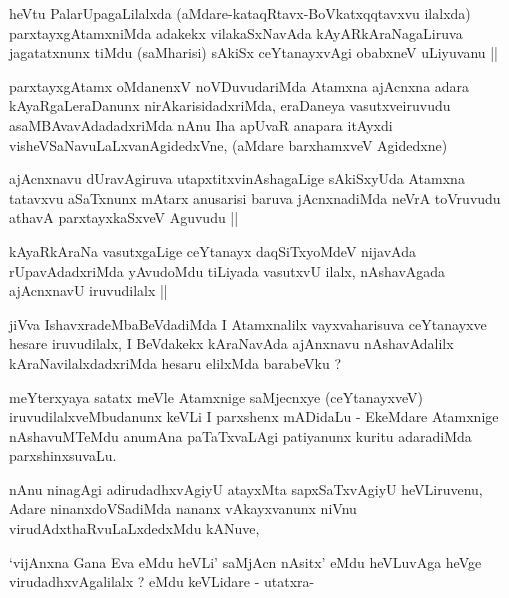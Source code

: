\begin{artha}
heVtu PalarUpagaLilalxda (aMdare-kataqRtavx-BoVkatxqqtavxvu ilalxda)
parxtayxgAtamxniMda adakekx vilakaSxNavAda kAyARkAraNagaLiruva
jagatatxnunx tiMdu (saMharisi) sAkiSx ceYtanayxvAgi obabxneV uLiyuvanu ||
\end{artha}

\begin{artha}
parxtayxgAtamx oMdanenxV noVDuvudariMda Atamxna ajAcnxna adara
kAyaRgaLeraDanunx nirAkarisidadxriMda, eraDaneya vasutxveiruvudu
asaMBAvavAdadadxriMda nAnu Iha apUvaR anapara itAyxdi
visheVSaNavuLaLxvanAgidedxVne, (aMdare barxhamxveV Agidedxne) 
\end{artha}

\begin{artha}
ajAcnxnavu dUravAgiruva utapxtitxvinAshagaLige  sAkiSxyUda Atamxna
tatavxvu aSaTxnunx mAtarx anusarisi baruva jAcnxnadiMda neVrA
toVruvudu athavA parxtayxkaSxveV Aguvudu ||
\end{artha}

\begin{artha}
kAyaRkAraNa vasutxgaLige ceYtanayx daqSiTxyoMdeV nijavAda
rUpavAdadxriMda yAvudoMdu tiLiyada vasutxvU ilalx, nAshavAgada
ajAcnxnavU iruvudilalx ||
\end{artha}

\begin{artha}
jiVva IshavxradeMbaBeVdadiMda I Atamxnalilx vayxvaharisuva ceYtanayxve
hesare iruvudilalx, I BeVdakekx kAraNavAda ajAnxnavu nAshavAdalilx
kAraNavilalxdadxriMda hesaru elilxMda barabeVku ?
\end{artha}

\begin{artha}
meYterxyaya satatx meVle Atamxnige saMjecnxye (ceYtanayxveV)
iruvudilalxveMbudanunx keVLi I parxshenx mADidaLu - EkeMdare Atamxnige
nAshavuMTeMdu anumAna paTaTxvaLAgi patiyanunx kuritu adaradiMda parxshinxsuvaLu.
\end{artha}

\begin{artha}
nAnu ninagAgi adirudadhxvAgiyU atayxMta sapxSaTxvAgiyU heVLiruvenu,
Adare ninanxdoVSadiMda nananx vAkayxvanunx niVnu
virudAdxthaRvuLaLxdedxMdu kANuve,
\end{artha}

\begin{artha}
`vijAnxna Gana Eva eMdu heVLi' saMjAcn nAsitx' eMdu heVLuvAga heVge
  virudadhxvAgalilalx ? eMdu keVLidare - utatxra-
\end{artha}

